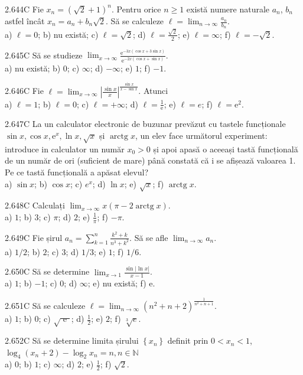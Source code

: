 \documentclass[11pt]{article}
\begin{document}
2.644C Fie $x_{n}=(\sqrt{2}+1)^{n}$. Pentru orice $n \geq 1$ există numere naturale $a_{n}$, $b_{n}$ astfel încât $x_{n}=a_{n}+b_{n} \sqrt{2}$. Să se calculeze $\ell=\lim _{n \rightarrow \infty} \frac{a_{n}}{b_{n}}$.\\ a) $\ell=0$; b) nu există; c) $\ell=\sqrt{2}$; d) $\ell=\frac{\sqrt{2}}{2}$; e) $\ell=\infty$; f) $\ell=-\sqrt{2}$.

2.645C Să se studieze $\lim _{x \rightarrow \infty} \frac{\mathrm{e}^{-3 x(\cos x+3 \sin x)}}{\mathrm{e}^{-2 x(\cos x+\sin x)}}$.\\ a) nu există; b) $0$; c) $\infty$; d) $-\infty$; e) $1$; f) $-1$.

2.646C Fie $\ell=\lim _{x \rightarrow \infty}\left|\frac{\sin x}{x}\right|^{\frac{\sin x}{x-\sin x}}$. Atunci\\ a) $\ell=1$; b) $\ell=0$; c) $\ell=+\infty$; d) $\ell=\frac{1}{\mathrm{e}}$; e) $\ell=e$; f) $\ell=\mathrm{e}^{2}$.

2.647C La un calculator electronic de buzunar prevăzut cu tastele funcționale $\sin x, \cos x, \mathrm{e}^{x}, \ln x, \sqrt{x}$ și $\operatorname{arctg} x$, un elev face următorul experiment: introduce in calculator un număr $x_{0}>0$ și apoi apasă o aceeași tastă funcțională de un număr de ori (suficient de mare) până constată că i se afișează valoarea 1. Pe ce tastă funcțională a apăsat elevul?\\ a) $\sin x$; b) $\cos x$; c) $e^{x}$; d) $\ln x$; e) $\sqrt{x}$; f) $\operatorname{arctg} x$.

2.648C Calculați $\lim _{x \rightarrow \infty} x(\pi-2 \operatorname{arctg} x)$.\\ a) $1$; b) $3$; c) $\pi$; d) $2$; e) $\frac{1}{\pi}$; f) $-\pi$.

2.649C Fie șirul $a_{n}=\sum_{k=1}^{n} \frac{k^{2}+k}{n^{3}+k^{2}}$. Să se afle $\lim _{n \rightarrow \infty} a_{n}$.\\ a) $1 / 2$; b) $2$; c) $3$; d) $1 / 3$; e) $1$; f) $1 / 6$.

2.650C Să se determine $\lim _{x \rightarrow 1} \frac{\sin |\ln x|}{x-1}$.\\ a) $1$; b) $-1$; c) $0$; d) $\infty$; e) nu există; f) $\mathrm{e}$.

2.651C Să se calculeze $\ell=\lim _{n \rightarrow \infty}\left(n^{2}+n+2\right)^{\frac{1}{n^{2}+n+1}}$.\\ a) $1$; b) $0$; c) $\sqrt{\text { e }}$; d) $\frac{1}{2}$; e) $2$; f) $\sqrt[3]{e}$.

2.652C Să se determine limita șirului $\left\{x_{n}\right\}$ definit prin $0<x_{n}<1$, $\log _{4}\left(x_{n}+2\right)-\log _{2} x_{n}=n, n \in \mathbb{N}$\\ a) $0$; b) $1$; c) $\infty$; d) $2$; e) $\frac{1}{2}$; f) $\sqrt{2}$.
\end{document}
